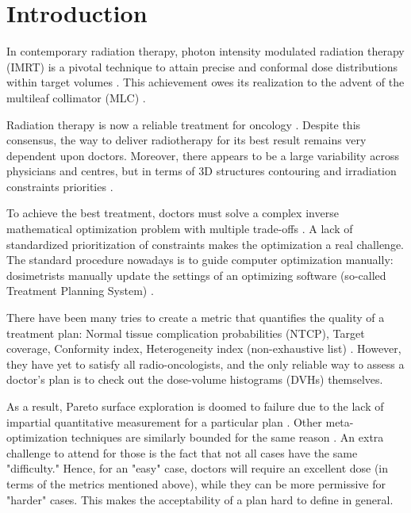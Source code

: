 \section{Introduction}
In contemporary radiation therapy, photon intensity modulated radiation therapy (IMRT) is a pivotal technique to attain precise and conformal dose distributions within target volumes \cite{xu_comparison_2017}.
This achievement owes its realization to the advent of the multileaf collimator (MLC) \cite{galvin_characterization_1993}.

Radiation therapy is now a reliable treatment for oncology \cite{valentini_survival_2009}.
Despite this consensus, the way to deliver radiotherapy for its best result remains very dependent upon doctors.
Moreover, there appears to be a large variability across physicians and centres, but in terms of 3D structures contouring and irradiation constraints priorities \cite{variability_2021}.

To achieve the best treatment, doctors must solve a complex inverse mathematical optimization problem with multiple trade-offs \cite{oelfke_inverse_2001} \cite{webb_physical_2003}.
A lack of standardized prioritization of constraints makes the optimization a real challenge.
The standard procedure nowadays is to guide computer optimization manually: dosimetrists manually update the settings of an optimizing software (so-called Treatment Planning System) \cite{planification_website}.

There have been many tries to create a metric that quantifies the quality of a treatment plan: Normal tissue complication probabilities (NTCP), Target coverage, Conformity index, Heterogeneity index (non-exhaustive list) \cite{lyman_normal_1992} \cite{li_input_2022}.\label{metrics}
However, they have yet to satisfy all radio-oncologists, and the only reliable way to assess a doctor's plan is to check out the dose-volume histograms (DVHs) themselves.

As a result, Pareto surface exploration is doomed to failure due to the lack of impartial quantitative measurement for a particular plan \cite{huang_pareto_2021}.
Other meta-optimization techniques are similarly bounded for the same reason \cite{wu_optimization_2001} \cite{xing_optimization_1999}.
An extra challenge to attend for those is the fact that not all cases have the same "difficulty."
Hence, for an "easy" case, doctors will require an excellent dose (in terms of the metrics mentioned above), while they can be more permissive for "harder" cases.
This makes the acceptability of a plan hard to define in general.

